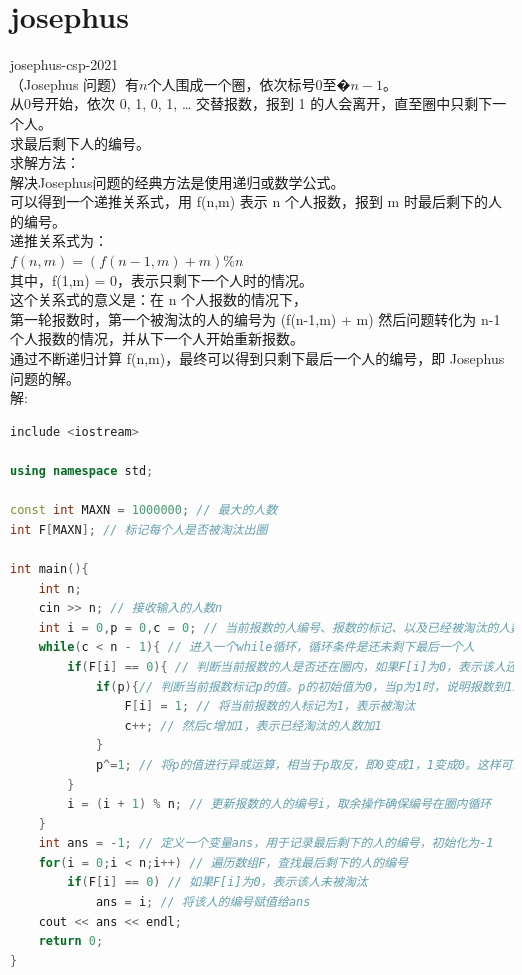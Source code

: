 \documentclass[12pt,twiside,a4paper]{ctexbook}
\numberwithin{chapter}{part}
\begin{document}
\section{josephus}
josephus-csp-2021\\
（Josephus 问题）有$n$个人围成一个圈，依次标号0至$�n-1$。\\
从0号开始，依次 0, 1, 0, 1, … 交替报数，报到 1 的人会离开，直至圈中只剩下一个人。\\
求最后剩下人的编号。\\
求解方法：\\
解决Josephus问题的经典方法是使用递归或数学公式。\\
可以得到一个递推关系式，用 f(n,m) 表示 n 个人报数，报到 m 时最后剩下的人的编号。\\
递推关系式为：\\
$f(n,m)=(f(n-1,m)+m)\%n$\\
其中，f(1,m) = 0，表示只剩下一个人时的情况。\\
这个关系式的意义是：在 n 个人报数的情况下，\\
第一轮报数时，第一个被淘汰的人的编号为 (f(n-1,m) + m) %
然后问题转化为 n-1 个人报数的情况，并从下一个人开始重新报数。\\
通过不断递归计算 f(n,m)，最终可以得到只剩下最后一个人的编号，即 Josephus 问题的解。\\
解:\\
\begin{lstlisting}[language=c++,breaklines=true]
include <iostream>

using namespace std;

const int MAXN = 1000000; // 最大的人数
int F[MAXN]; // 标记每个人是否被淘汰出圈

int main(){
	int n;
	cin >> n; // 接收输入的人数n
	int i = 0,p = 0,c = 0; // 当前报数的人编号、报数的标记、以及已经被淘汰的人数
	while(c < n - 1){ // 进入一个while循环，循环条件是还未剩下最后一个人
		if(F[i] == 0){ // 判断当前报数的人是否还在圈内，如果F[i]为0，表示该人还在圈内
			if(p){// 判断当前报数标记p的值。p的初始值为0，当p为1时，说明报数到1i，该人将被淘汰
				F[i] = 1; // 将当前报数的人标记为1，表示被淘汰
				c++; // 然后c增加1，表示已经淘汰的人数加1 
			} 
			p^=1; // 将p的值进行异或运算，相当于p取反，即0变成1，1变成0。这样可以实现交替报数的效果
		}
		i = (i + 1) % n; // 更新报数的人的编号i，取余操作确保编号在圈内循环
	}
	int ans = -1; // 定义一个变量ans，用于记录最后剩下的人的编号，初始化为-1
	for(i = 0;i < n;i++) // 遍历数组F，查找最后剩下的人的编号
		if(F[i] == 0) // 如果F[i]为0，表示该人未被淘汰
			ans = i; // 将该人的编号赋值给ans
	cout << ans << endl;
	return 0;
}
\end{lstlisting}

\clearpage
\end{document}
